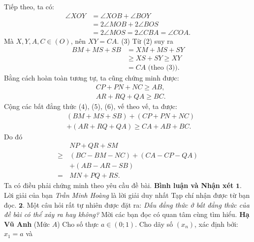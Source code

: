 \begin{multicols}{2}
\begin{figure}[H]
		\vspace*{-15pt}
	\end{figure}
	Tiếp theo, ta có:
	\begin{align*}
		\angle XOY &= \angle XOB + \angle BOY \\
		&= 2\angle MOB + 2\angle BOS \\
		&= 2\angle MOS = 2\angle CBA = \angle COA.
	\end{align*}
	Mà $X, Y, A, C \in (O)$, nên $XY = CA$. \hfill ($3$)
	\vskip 0.05cm
	Từ ($2$) suy ra
	\begin{align*}
		BM + MS + SB &= XM + MS + SY \\
		&\ge XS + SY \ge XY \\
		&= CA \text{ (theo ($3$))}. \tag{$4$}  
	\end{align*}
	Bằng cách hoàn toàn tương tự, ta cũng chứng minh được:
	\begin{align*}
		&CP + PN + NC \ge AB,   \tag{$5$}\\
		&AR + RQ + QA \ge BC.  \tag{$6$}
	\end{align*}                      
	Cộng các bất đẳng thức ($4$), ($5$), ($6$), vế theo vế, ta được:
	\begin{align*}
		&(BM + MS + SB) + (CP + PN + NC) \\
		&+ (AR + RQ + QA) \ge CA + AB + BC.	
	\end{align*}
	Do đó
	\begin{align*}
		&NP + QR + SM\\
		\ge &(BC - BM - NC) + (CA - CP - QA) \\
		&+ (AB - AR - SB)\\
		= \,&MN + PQ + RS.
	\end{align*}
	Ta có điều phải chứng minh theo yêu cầu đề bài.
	\vskip 0.05cm
	\textbf{\color{thachthuctoanhoc}Bình luận và Nhận xét}
	\vskip 0.05cm
	$\pmb{1.}$ Lời giải của bạn \textit{Trần Minh Hoàng} là lời giải duy nhất Tạp chí nhận được từ bạn đọc.
	\vskip 0.05cm
	$\pmb{2.}$ Một câu hỏi rất tự nhiên được đặt ra: \textit{Dấu đẳng thức ở bất đẳng thức của đề bài có thể xảy ra hay không?} Mời các bạn đọc có quan tâm cùng tìm hiểu.
	\vskip 0.05cm
	\hfill	\textbf{\color{thachthuctoanhoc}Hạ Vũ Anh}
	\vskip 0.05cm
	{}
	(Mức $A$) Cho số thực $a\in(0;1)$. Cho dãy số $(x_n)$, xác định bởi: $x_1=a$  và 

\end{multicols}
